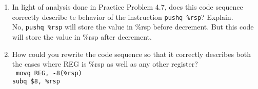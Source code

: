 \documentclass{article}
\begin{document}
\begin{enumerate}[label=\textbf{\Alph*.}]
	\item In light of analysis done in Practice Problem 4.7, does this code
	sequence correctly describe te behavior of the instruction \texttt{pushq \%rsp}? Explain. \\
	No, \texttt{pushq \%rsp} will store the value in \%rsp before decrement. But this code will
	store the value in \%rsp after decrement.
	\item How could you rewrite the code sequence so that it correctly describes both
	the cases where REG is \%rsp as well as any other register? \\
	\texttt{
	movq REG, -8(\%rsp) \\
	subq \$8, \%rsp \\
	}
\end{enumerate}
\end{document}
